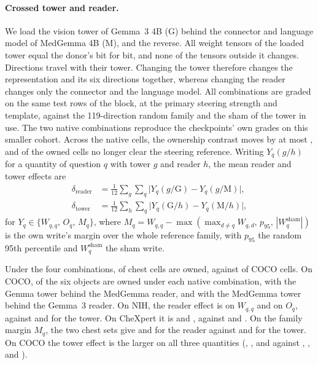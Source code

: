 \paragraph{Crossed tower and reader.} We load the vision tower of Gemma~3 4B (G) behind the connector and language model of MedGemma 4B (M), and the reverse. All \cfSwapTensors{} weight tensors of the loaded tower equal the donor's bit for bit, and none of the \cfSwapOutside{} tensors outside it changes. Directions travel with their tower. Changing the tower therefore changes the representation and its six directions together, whereas changing the reader changes only the connector and the language model. All \cfSwapCombos{} combinations are graded on the same \cfSwapRows{} test rows of the block, at the primary steering strength and template, against the 119-direction random family and the sham of the tower in use. The two native combinations reproduce the checkpoints' own grades on this smaller cohort. Across the \cfSwapNativeCells{} native cells, the ownership contrast moves by at most \cfSwapNativeMaxDO{}, and \cfSwapNativeLostReference{} of the \cfSwapNativeOwnedFull{} owned cells no longer clear the steering reference. Writing $Y_q(g/h)$ for a quantity of question $q$ with tower $g$ and reader $h$, the mean reader and tower effects are
\begin{equation}
\begin{aligned}
\delta_{\text{reader}}&=\frac{1}{12}\sum_{g}\sum_{q}\bigl|Y_q(g/\mathrm G)-Y_q(g/\mathrm M)\bigr|,\\
\delta_{\text{tower}}&=\frac{1}{12}\sum_{h}\sum_{q}\bigl|Y_q(\mathrm G/h)-Y_q(\mathrm M/h)\bigr|,
\end{aligned}
\label{eq:crossover}
\end{equation}
for $Y_q\in\{W_{q,q},\,O_q,\,M_q\}$, where $M_q=W_{q,q}-\max(\max_{d\neq q}W_{q,d},\,p_{95},\,|W^{\mathrm{sham}}_q|)$ is the own write's margin over the whole reference family, with $p_{95}$ the random 95th percentile and $W^{\mathrm{sham}}_q$ the sham write.

Under the four combinations, \cfSwapChestOwned{} of \cfSwapChestCells{} chest cells are owned, against \cfSwapCocoOwned{} of \cfSwapCocoCells{} COCO cells. On COCO, \cfSwapCocoNativeMin{} of the six objects are owned under each native combination, \cfSwapCocoGemmaTowerCross{} with the Gemma tower behind the MedGemma reader, and \cfSwapCocoMedTowerCross{} with the MedGemma tower behind the Gemma~3 reader. On NIH, the reader effect is \cfSwapReaderNihMin{} on $W_{q,q}$ and \cfSwapReaderNihOMin{} on $O_q$, against \cfSwapTowerNihMin{} and \cfSwapTowerNihOMin{} for the tower. On CheXpert it is \cfSwapReaderChexMin{} and \cfSwapReaderChexOMin{}, against \cfSwapTowerChexMin{} and \cfSwapTowerChexOMin{}. On the family margin $M_q$, the two chest sets give \cfSwapReaderNihMMin{} and \cfSwapReaderChexMMin{} for the reader against \cfSwapTowerNihMMin{} and \cfSwapTowerChexMMin{} for the tower. On COCO the tower effect is the larger on all three quantities (\cfSwapTowerCocoMin{}, \cfSwapTowerCocoOMin{}, and \cfSwapTowerCocoMMin{} against \cfSwapReaderCocoMin{}, \cfSwapReaderCocoOMin{}, and \cfSwapReaderCocoMMin{}).

